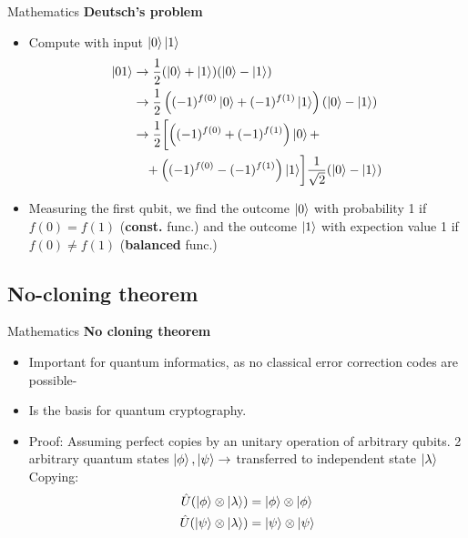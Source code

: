 \documentclass{beamer}
\begin{document}
\begin{frame}{Mathematics}
\textbf{Deutsch's problem}
	\begin{itemize}
    	\item Compute with input $\ket{0}\ket{1} $
        \begin{equation}\begin{split}
\ket{01} & \rightarrow \frac{1}{2}(\ket{0}+\ket{1})(\ket{0}-\ket{1}) \\
	& \rightarrow \frac{1}{2}\left((-1)^{f(0)}\ket{0}+(-1)^{f(1)}\ket{1}\right)(\ket{0}-\ket{1}) \\
    & \rightarrow \frac{1}{2}\biggl[\left((-1)^{f(0)}+(-1)^{f(1)}\right)\ket{0} + \\ 
    & \quad + \left((-1)^{f(0)}-(-1)^{f(1)}\right)\ket{1}\biggr]\frac{1}{\sqrt{2}}(\ket{0}-\ket{1}) 
        \end{split}\end{equation}
        \item Measuring the first qubit, we find the outcome $\ket{0}$ with probability 1 if $f(0)=f(1)$ (\textbf{const.} func.) and the outcome $\ket{1}$ with expection value 1 if $f(0)\neq f(1)$ (\textbf{balanced} func.)
    \end{itemize}
\end{frame}

\subsection{No-cloning theorem}
\begin{frame}{Mathematics}
\textbf{No cloning theorem}
	\begin{itemize}
    \item Important for quantum informatics, as no classical error correction codes are possible-
    \item Is the basis for quantum cryptography.
    \item Proof: Assuming perfect copies by an unitary operation of arbitrary qubits. 2 arbitrary quantum states $\ket{\phi}, \ket{\psi} \rightarrow$ transferred to independent state $\ket{\lambda}$ \\
    Copying:
    \begin{align}
\hat{U}(\ket{\phi}\otimes\ket{\lambda}) & = \ket{\phi}\otimes\ket{\phi} \\
\hat{U}(\ket{\psi}\otimes\ket{\lambda}) & = \ket{\psi}\otimes\ket{\psi}
    \end{align}
	\end{itemize}
\end{frame}
\end{document}
